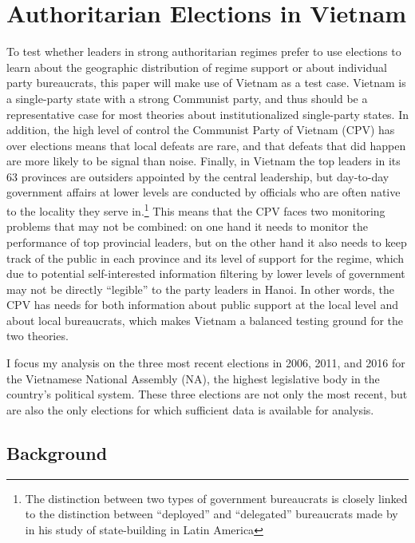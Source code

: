 \documentclass[12pt]{article}\usepackage[]{graphicx}\usepackage[]{color}
\newcommand{\1}{\mathbbm{1}}
\begin{document}
\section{Authoritarian Elections in Vietnam}
\label{sec:vietnam}
To test whether leaders in strong authoritarian regimes prefer to use elections to learn about the geographic distribution of regime support or about individual party bureaucrats, this paper will make use of Vietnam as a test case. Vietnam is a single-party state with a strong Communist party, and thus should be a representative case for most theories about institutionalized single-party states. In addition, the high level of control the Communist Party of Vietnam (CPV) has over elections \citep{MaleskySchuler2011} means that local defeats are rare, and that defeats that did happen are more likely to be signal than noise. Finally, in Vietnam the top leaders in its 63 provinces are outsiders appointed by the central leadership, but day-to-day government affairs at lower levels are conducted by officials who are often native to the locality they serve in.\footnote{The distinction between two types of government bureaucrats is closely linked to the distinction between ``deployed'' and ``delegated'' bureaucrats made by \cite{Soifer2015} in his study of state-building in Latin America} This means that the CPV faces two monitoring problems that may not be combined: on one hand it needs to monitor the performance of top provincial leaders, but on the other hand it also needs to keep track of the public in each province and its level of support for the regime, which due to potential self-interested information filtering by lower levels of government may not be directly ``legible'' \cite[in the words of][]{Scott1998} to the party leaders in Hanoi. In other words, the CPV has needs for both information about public support at the local level and about local bureaucrats, which makes Vietnam a balanced testing ground for the two theories.

I focus my analysis on the three most recent elections in 2006, 2011, and 2016 for the Vietnamese National Assembly (NA), the highest legislative body in the country's political system. These three elections are not only the most recent, but are also the only elections for which sufficient data is available for analysis.

\subsection{Background}
\end{document}
